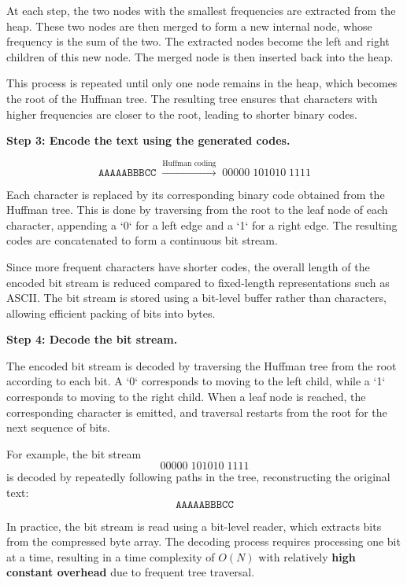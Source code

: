 \vspace{0.3em}
\noindent At each step, the two nodes with the smallest frequencies are extracted from the heap. These two nodes are then merged to form a new internal node, whose frequency is the sum of the two. The extracted nodes become the left and right children of this new node. The merged node is then inserted back into the heap.

\vspace{0.3em}
\noindent This process is repeated until only one node remains in the heap, which becomes the root of the Huffman tree. The resulting tree ensures that characters with higher frequencies are closer to the root, leading to shorter binary codes.

\medskip
\noindent \textbf{Step 3: Encode the text using the generated codes.}

\[
\texttt{AAAAABBBCC}
\;\xrightarrow{\text{Huffman coding}}\;
00000\;101010\;1111
\]

\noindent Each character is replaced by its corresponding binary code obtained from the Huffman tree. This is done by traversing from the root to the leaf node of each character, appending a `0` for a left edge and a `1` for a right edge. The resulting codes are concatenated to form a continuous bit stream.

\vspace{0.3em}
\noindent Since more frequent characters have shorter codes, the overall length of the encoded bit stream is reduced compared to fixed-length representations such as ASCII. The bit stream is stored using a bit-level buffer rather than characters, allowing efficient packing of bits into bytes.

\medskip
\noindent \textbf{Step 4: Decode the bit stream.}

\noindent The encoded bit stream is decoded by traversing the Huffman tree from the root according to each bit. A `0` corresponds to moving to the left child, while a `1` corresponds to moving to the right child. When a leaf node is reached, the corresponding character is emitted, and traversal restarts from the root for the next sequence of bits.

\noindent For example, the bit stream
\[
00000\;101010\;1111
\]
is decoded by repeatedly following paths in the tree, reconstructing the original text:
\[
\texttt{AAAAABBBCC}
\]

\noindent In practice, the bit stream is read using a bit-level reader, which extracts bits from the compressed byte array. The decoding process requires processing one bit at a time, resulting in a time complexity of $O(N)$ with relatively \textbf{high constant overhead} due to frequent tree traversal. \\


